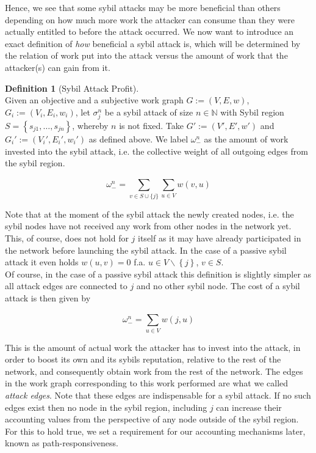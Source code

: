 \documentclass[11pt,a4paper]{article}
\theoremstyle{definition}
\newtheorem{definition}{Definition}[section]
\theoremstyle{theorem}
\theoremstyle{proposition}
\theoremstyle{corollary}
\theoremstyle{lemma}
\theoremstyle{example}
\theoremstyle{remark}
\begin{document}
\noindent{}Hence, we see that some sybil attacks may be more beneficial than others depending on how much more work the attacker can consume than they were actually entitled to before the attack occurred. We now want to introduce an exact definition of {\it how} beneficial a sybil attack is, which will be determined by the relation of work put into the attack versus the amount of work that the attacker(s) can gain from it.\vspace{1em}\\

\begin{definition}[Sybil Attack Profit]\ \\
Given an objective and a subjective work graph $G:=(V,E,w)$, $G_i:=(V_i,E_i,w_i)$, let $\sigma_j^n$ be a sybil attack of size $n\in\mathbb{N}$ with Sybil region $S=\left\lbrace{}s_{j1},\ldots,s_{jn}\right\rbrace$, whereby $n$ is not fixed. Take $G':=(V',E',w')$ and $G_i':=(V_i',E_i',w_i')$ as defined above. We label $\omega_{-}^{n}$ as the amount of work invested into the sybil attack, i.e. the collective weight of all outgoing edges from the sybil region. 

\[
\omega_{-}^{n} = \sum\limits_{v\in{S}\cup\{j\}}\sum\limits_{u\in{}V}^{}w(v,u)
\]

\noindent{}Note that at the moment of the sybil attack the newly created nodes, i.e. the sybil nodes have not received any work from other nodes in the network yet. This, of course, does not hold for $j$ itself as it may have already participated in the network before launching the sybil attack. In the case of a passive sybil attack it even holds $w(u,v)=0$ f.a. $u\in{}V\backslash{}\left\lbrace{}j\right\rbrace$, $v\in{}S$.\vspace{1em}\\

\noindent{}Of course, in the case of a passive sybil attack this definition is slightly simpler as all attack edges are connected to $j$ and no other sybil node. The cost of a sybil attack is then given by 

\[
\omega_{-}^{n} = \sum\limits_{u\in{}V}^{}w(j,u)
\]

\noindent{}This is the amount of actual work the attacker has to invest into the attack, in order to boost its own and its sybils reputation, relative to the rest of the network, and consequently obtain work from the rest of the network. The edges in the work graph corresponding to this work performed are what we called {\it attack edges}. Note that these edges are indispensable for a sybil attack. If no such edges exist then no node in the sybil region, including $j$ can increase their accounting values from the perspective of any node outside of the sybil region. For this to hold true, we set a requirement for our accounting mechanisms later, known as path-responsiveness.  \vspace{1em}\\


\end{definition}
\end{document}
